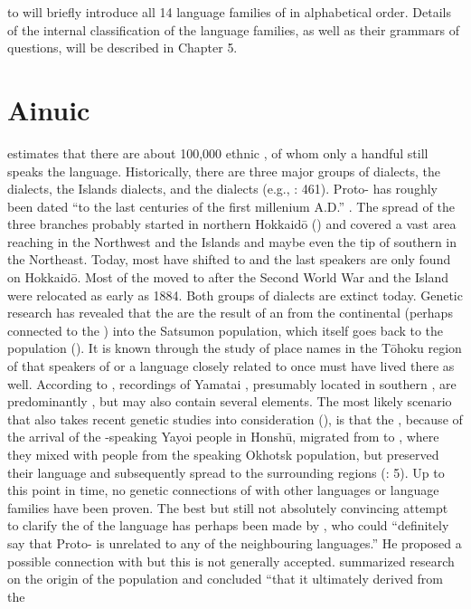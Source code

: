  to  will briefly introduce all 14 language families of  in alphabetical order. Details of the internal classification of the language families, as well as their grammars of questions, will be described in Chapter 5.

\clearpage 
\section{Ainuic}\label{sec:2.1}

\citet[463]{Bugaeva2012} estimates that there are about 100,000 ethnic , of whom only a handful still speaks the language. Historically, there are three major groups of dialects, the  dialects, the  Islands dialects, and the dialects (e.g., \citealt{Bugaeva2012}: 461). Proto- has roughly been dated “to the last centuries of the first millenium A.D.” \citep[155]{Vovin1993}. The spread of the three branches probably started in northern Hokkaid\=o (\citealt{LeeHasegawa2013}) and covered a vast area reaching  in the Northwest and the  Islands and maybe even the tip of southern  in the Northeast. Today, most  have shifted to  and the last speakers are only found on Hokkaid\=o. Most of the   moved to  after the Second World War and the  Island  were relocated as early as 1884. Both groups of dialects are extinct today. Genetic research has revealed that the  are the result of an  from the continental  (perhaps connected to the ) into the Satsumon population, which itself goes back to the  population (\citealt{Sato2007}). It is known through the study of place names in the T\=ohoku region of  that speakers of  or a language closely related to  once must have lived there as well. According to \citet[33]{Bentley2008b},  recordings of Yamatai , presumably located in southern , are predominantly , but may also contain several  elements. The most likely scenario that also takes recent genetic studies into consideration (\citealt{Jinam2012}), is that the , because of the arrival of the -speaking Yayoi people in Honshū, migrated from  to , where they mixed with people from the  speaking Okhotsk population, but preserved their language and subsequently spread to the surrounding regions (\citealt{LeeHasegawa2013}: 5). Up to this point in time, no genetic connections of  with other languages or language families have been proven. The best but still not absolutely convincing attempt to clarify the  of the  language has perhaps been made by \citet[175]{Vovin1993}, who could “definitely say that Proto- is unrelated to any of the neighbouring languages.” He proposed a possible connection with  but this is not generally accepted. \citet[219]{MatsumuraOxenham2013} summarized research on the origin of the  population and concluded “that it ultimately derived from the 